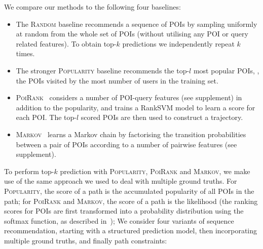We compare our methods to the following four baselines:
\begin{itemize}[leftmargin=0.125in]%
\item The \textsc{Random} baseline recommends a sequence of POIs by sampling uniformly at random from the whole set of POIs
      (without utilising any POI or query related features). 
      To obtain top-$k$ predictions we independently repeat $k$ times.

\item The stronger \textsc{Popularity} baseline recommends the top-$l$ most popular POIs,
      \ie, the POIs visited by the most number of users in the training set.

\item \textsc{PoiRank}~\cite{cikm16paper}
      considers a number of POI-query features (see supplement) in addition to the popularity,
      and trains a RankSVM model%
      to learn a score for each POI. The top-$l$ scored POIs are then used to construct a trajectory.

\item \textsc{Markov}~\cite{cikm16paper} learns a Markov chain by factorising the transition probabilities between a pair of POIs 
      according to a number of pairwise features (see supplement). 

\end{itemize}%
To perform top-$k$ prediction with \textsc{Popularity}, \textsc{PoiRank} and \textsc{Markov},
we make use of the same approach we used to deal with multiple ground truths.
For \textsc{Popularity}, the score of a path is the accumulated popularity of all POIs in the path;
for \textsc{PoiRank} and \textsc{Markov}, the score of a path is the likelihood
(the ranking scores for POIs are first transformed into a probability distribution using the softmax function, as described in~\cite{cikm16paper});
We consider four variants of sequence recommendation, starting with a structured prediction model, then incorporating multiple ground truths, and finally path constraints:
